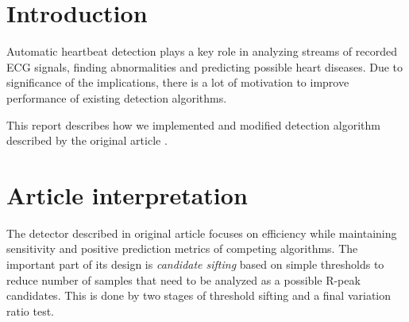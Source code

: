 \documentclass[fleqn,moreauthors,10pt]{ds_report}
\affiliation{\textsuperscript{1}\textit{ae4664@student.uni-lj.si, 63160011}}
\begin{document}
\flushbottom

\maketitle

\thispagestyle{empty}


\section*{Introduction}
	
Automatic heartbeat detection plays a key role in analyzing streams of recorded ECG signals, finding abnormalities and predicting possible heart diseases. Due to significance of the implications, there is a lot of motivation to improve performance of existing detection algorithms.

This report describes how we implemented and modified detection algorithm described by the original article \cite{ding}.


\section*{Article interpretation}

The detector described in original article focuses on efficiency while maintaining sensitivity and positive prediction metrics of competing algorithms. The important part of its design is \textit{candidate sifting} based on simple thresholds to reduce number of samples that need to be analyzed as a possible R-peak candidates. This is done by two stages of threshold sifting and a final variation ratio test. 
\end{document}
